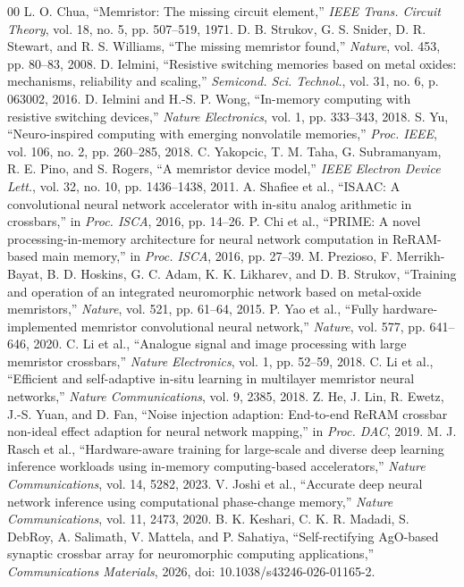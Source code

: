 \documentclass[conference]{IEEEtran}
\begin{document}
\begin{thebibliography}{00}
 L. O. Chua, ``Memristor: The missing circuit element,''
\textit{IEEE Trans. Circuit Theory}, vol. 18, no. 5, pp. 507--519, 1971.
 D. B. Strukov, G. S. Snider, D. R. Stewart, and R. S.
Williams, ``The missing memristor found,'' \textit{Nature}, vol. 453, pp.
80--83, 2008.
 D. Ielmini, ``Resistive switching memories based on metal
oxides: mechanisms, reliability and scaling,'' \textit{Semicond. Sci. Technol.},
vol. 31, no. 6, p. 063002, 2016.
 D. Ielmini and H.-S. P. Wong, ``In-memory computing with
resistive switching devices,'' \textit{Nature Electronics}, vol. 1, pp.
333--343, 2018.
 S. Yu, ``Neuro-inspired computing with emerging nonvolatile
memories,'' \textit{Proc. IEEE}, vol. 106, no. 2, pp. 260--285, 2018.
 C. Yakopcic, T. M. Taha, G. Subramanyam, R. E. Pino, and
S. Rogers, ``A memristor device model,'' \textit{IEEE Electron Device Lett.},
vol. 32, no. 10, pp. 1436--1438, 2011.
 A. Shafiee et al., ``ISAAC: A convolutional neural network
accelerator with in-situ analog arithmetic in crossbars,'' in \textit{Proc.
ISCA}, 2016, pp. 14--26.
 P. Chi et al., ``PRIME: A novel processing-in-memory
architecture for neural network computation in ReRAM-based main memory,'' in
\textit{Proc. ISCA}, 2016, pp. 27--39.
 M. Prezioso, F. Merrikh-Bayat, B. D. Hoskins, G. C.
Adam, K. K. Likharev, and D. B. Strukov, ``Training and operation of an
integrated neuromorphic network based on metal-oxide memristors,''
\textit{Nature}, vol. 521, pp. 61--64, 2015.
 P. Yao et al., ``Fully hardware-implemented memristor
convolutional neural network,'' \textit{Nature}, vol. 577, pp. 641--646, 2020.
 C. Li et al., ``Analogue signal and image processing with large
memristor crossbars,'' \textit{Nature Electronics}, vol. 1, pp. 52--59, 2018.
 C. Li et al., ``Efficient and self-adaptive in-situ
learning in multilayer memristor neural networks,'' \textit{Nature
Communications}, vol. 9, 2385, 2018.
 Z. He, J. Lin, R. Ewetz, J.-S. Yuan, and D. Fan, ``Noise
injection adaption: End-to-end ReRAM crossbar non-ideal effect adaption for
neural network mapping,'' in \textit{Proc. DAC}, 2019.
 M. J. Rasch et al., ``Hardware-aware training for large-scale
and diverse deep learning inference workloads using in-memory computing-based
accelerators,'' \textit{Nature Communications}, vol. 14, 5282, 2023.
 V. Joshi et al., ``Accurate deep neural network inference
using computational phase-change memory,'' \textit{Nature Communications}, vol.
11, 2473, 2020.
 B. K. Keshari, C. K. R. Madadi, S. DebRoy, A. Salimath, V.
Mattela, and P. Sahatiya, ``Self-rectifying AgO-based synaptic crossbar array
for neuromorphic computing applications,'' \textit{Communications Materials},
2026, doi: 10.1038/s43246-026-01165-2.
\end{thebibliography}

\appendices

\end{document}
